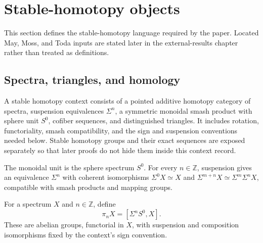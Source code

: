 \section{Stable-homotopy objects}
\label{chap:stable-background}

This section defines the stable-homotopy language required by the paper.  Located May, Moss, and Toda inputs are stated later in the external-results chapter rather than treated as definitions.

\subsection{Spectra, triangles, and homology}

\begin{definition}
  \label{def:stable-context}
  \notready
  A stable homotopy context consists of a pointed additive homotopy category
  of spectra, suspension equivalences $\Sigma^n$, a symmetric monoidal smash
  product with sphere unit $S^0$, cofiber sequences, and distinguished
  triangles.  It includes rotation, functoriality, smash compatibility, and
  the sign and suspension conventions needed below.  Stable homotopy groups
  and their exact sequences are exposed separately so that later proofs do not
  hide them inside this context record.
\end{definition}

\begin{definition}
  \label{def:stable-sphere-suspension}
  \notready
  The monoidal unit is the sphere spectrum $S^0$.  For every $n\in\mathbb Z$,
  suspension gives an equivalence $\Sigma^n$ with coherent isomorphisms
  $\Sigma^0X\simeq X$ and $\Sigma^{m+n}X\simeq\Sigma^m\Sigma^nX$, compatible
  with smash products and mapping groups.
\end{definition}

\begin{definition}
  \label{def:stable-homotopy-group}
  \notready
  For a spectrum $X$ and $n\in\mathbb Z$, define
  \[
    \pi_nX=[\Sigma^nS^0,X].
  \]
  These are abelian groups, functorial in $X$, with suspension and composition
  isomorphisms fixed by the context's sign convention.
\end{definition}

